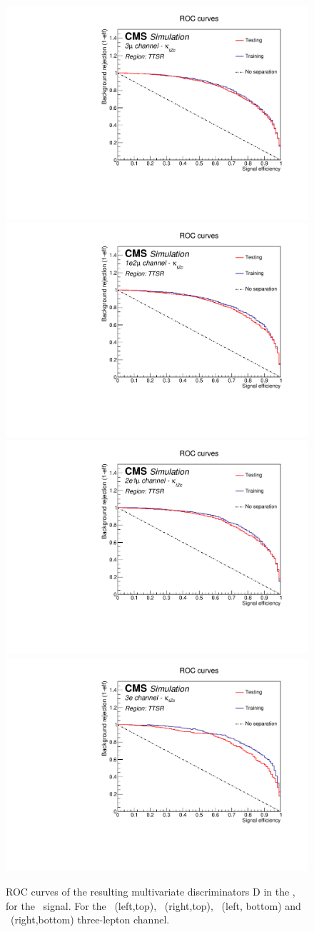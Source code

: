 \begin{figure}[htbp]
	\centering
	\includegraphics[width=0.49\linewidth]{6_Search/Figures/PlotsTechnics/ROCZcttoppairuuu}
	\includegraphics[width=0.49\linewidth]{6_Search/Figures/PlotsTechnics/ROCZcttoppairuue}
	\includegraphics[width=0.49\linewidth]{6_Search/Figures/PlotsTechnics/ROCZcttoppaireeu}
	\includegraphics[width=0.49\linewidth]{6_Search/Figures/PlotsTechnics/ROCZcttoppaireee}
	\caption{ROC curves of the resulting  multivariate discriminators D in the \TTSR, for the \Zct\ signal. For the \mumumu\ (left,top), \emumu\ (right,top), \eemu\ (left, bottom) and \eee\ (right,bottom) three-lepton channel.}
	\label{fig:roczcttoppair}
\end{figure}


